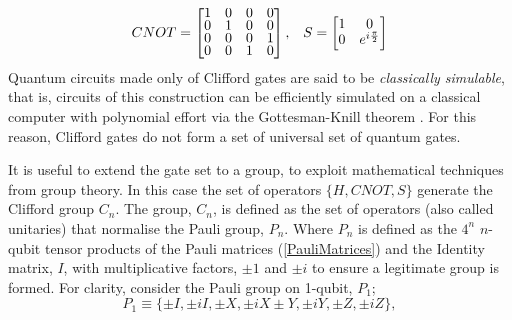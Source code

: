 \begin{align}
    \label{CNOT}
    CNOT =
    \renewcommand{\arraystretch}{0.75}
    \begin{bmatrix}
        1 & 0 & 0 & 0 \\
        0 & 1 & 0 & 0 \\
        0 & 0 & 0 & 1 \\
        0 & 0 & 1 & 0
    \end{bmatrix},
     &  & S =
    \begin{bmatrix}
        1 & 0                  \\
        0 & e^{i\frac{\pi}{2}}
    \end{bmatrix}
\end{align}
Quantum circuits made only of Clifford gates are said to be \textit{classically simulable}, that is, circuits of this construction can be efficiently
simulated on a classical computer with polynomial effort via the Gottesman-Knill theorem \cite{knillGottesman}. For this reason, Clifford gates do not form
a set of universal set of quantum gates.

It is useful to extend the gate set to a group, to exploit mathematical techniques from group theory.
In this case the set of operators $\{H, CNOT, S\}$ generate the Clifford group $C_n$. The group, $C_n$,
is defined as the set of operators (also called unitaries) that normalise the Pauli group, $P_n$. Where
$P_n$ is defined as the $4^n$ $n$-qubit tensor products of the Pauli matrices (\ref{PauliMatrices}) and the
Identity matrix, $I$, with multiplicative factors, $\pm 1$ and $\pm i$ to ensure a legitimate group is formed.
For clarity, consider the Pauli group on 1-qubit, $P_1$;
\begin{equation}
    P_1 \equiv \{ \pm I, \pm iI, \pm X, \pm iX \pm Y, \pm iY, \pm Z, \pm iZ\},
\end{equation}



